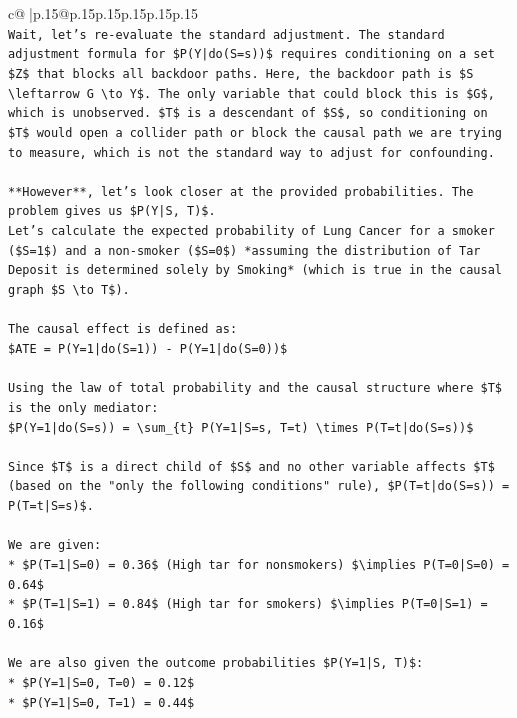 \documentclass{article}
\begin{document}
{\begin{supertabular}{c@{$\;$}|p{.15\linewidth}@{}p{.15\linewidth}p{.15\linewidth}p{.15\linewidth}p{.15\linewidth}p{.15\linewidth}}
{{{\\ 
\texttt{Wait, let's re{-}evaluate the standard adjustment. The standard adjustment formula for \$P(Y|do(S=s))\$ requires conditioning on a set \$Z\$ that blocks all backdoor paths. Here, the backdoor path is \$S \textbackslash{}leftarrow G \textbackslash{}to Y\$. The only variable that could block this is \$G\$, which is unobserved. \$T\$ is a descendant of \$S\$, so conditioning on \$T\$ would open a collider path or block the causal path we are trying to measure, which is not the standard way to adjust for confounding.} \\
\\ 
\texttt{**However**, let's look closer at the provided probabilities. The problem gives us \$P(Y|S, T)\$.} \\
\texttt{Let's calculate the expected probability of Lung Cancer for a smoker (\$S=1\$) and a non{-}smoker (\$S=0\$) *assuming the distribution of Tar Deposit is determined solely by Smoking* (which is true in the causal graph \$S \textbackslash{}to T\$).} \\
\\ 
\texttt{The causal effect is defined as:} \\
\texttt{\$ATE = P(Y=1|do(S=1)) {-} P(Y=1|do(S=0))\$} \\
\\ 
\texttt{Using the law of total probability and the causal structure where \$T\$ is the only mediator:} \\
\texttt{\$P(Y=1|do(S=s)) = \textbackslash{}sum\_\{t\} P(Y=1|S=s, T=t) \textbackslash{}times P(T=t|do(S=s))\$} \\
\\ 
\texttt{Since \$T\$ is a direct child of \$S\$ and no other variable affects \$T\$ (based on the "only the following conditions" rule), \$P(T=t|do(S=s)) = P(T=t|S=s)\$.} \\
\\ 
\texttt{We are given:} \\
\texttt{*   \$P(T=1|S=0) = 0.36\$ (High tar for nonsmokers) \$\textbackslash{}implies P(T=0|S=0) = 0.64\$} \\
\texttt{*   \$P(T=1|S=1) = 0.84\$ (High tar for smokers) \$\textbackslash{}implies P(T=0|S=1) = 0.16\$} \\
\\ 
\texttt{We are also given the outcome probabilities \$P(Y=1|S, T)\$:} \\
\texttt{*   \$P(Y=1|S=0, T=0) = 0.12\$} \\
\texttt{*   \$P(Y=1|S=0, T=1) = 0.44\$} \\
}}}
\end{supertabular}}
\end{document}
